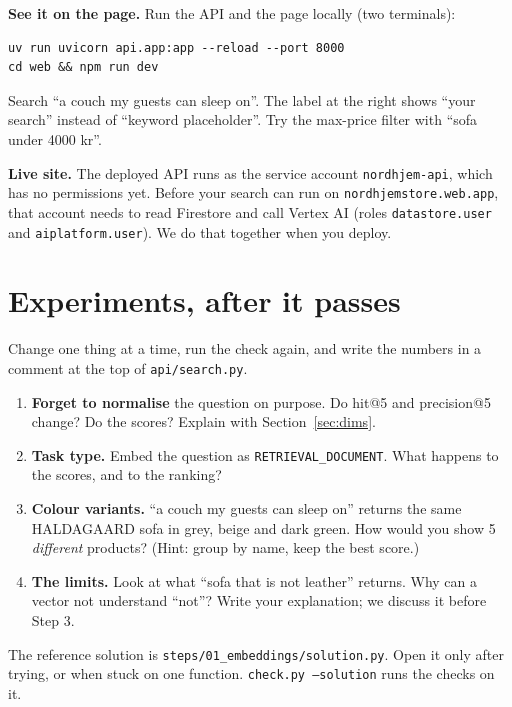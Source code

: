 \documentclass[11pt,a4paper]{article}
\newcommand{\code}[1]{\texttt{#1}}
\begin{document}
\textbf{See it on the page.} Run the API and the page locally (two
terminals):
\begin{lstlisting}[backgroundcolor=\color{white}]
uv run uvicorn api.app:app --reload --port 8000
cd web && npm run dev
\end{lstlisting}
Search ``a couch my guests can sleep on''. The label at the right shows
``your search'' instead of ``keyword placeholder''. Try the max-price
filter with ``sofa under 4000 kr''.

\begin{note}
\textbf{Live site.} The deployed API runs as the service account
\code{nordhjem-api}, which has no permissions yet. Before your search
can run on \code{nordhjemstore.web.app}, that account needs to read
Firestore and call Vertex AI (roles \code{datastore.user} and
\code{aiplatform.user}). We do that together when you deploy.
\end{note}

\section{Experiments, after it passes}

Change one thing at a time, run the check again, and write the numbers
in a comment at the top of \code{api/search.py}.

\begin{enumerate}[leftmargin=1.6em, itemsep=0.35em]
  \item \textbf{Forget to normalise} the question on purpose. Do hit@5
        and precision@5 change? Do the scores? Explain with
        Section~\ref{sec:dims}.
  \item \textbf{Task type.} Embed the question as
        \code{RETRIEVAL\_DOCUMENT}. What happens to the scores, and to
        the ranking?
  \item \textbf{Colour variants.} ``a couch my guests can sleep on''
        returns the same HALDAGAARD sofa in grey, beige and dark green.
        How would you show 5 \emph{different} products? (Hint: group by
        name, keep the best score.)
  \item \textbf{The limits.} Look at what ``sofa that is not leather''
        returns. Why can a vector not understand ``not''? Write your
        explanation; we discuss it before Step 3.
\end{enumerate}

\begin{note}
The reference solution is \code{steps/01\_embeddings/solution.py}. Open
it only after trying, or when stuck on one function.
\code{check.py --solution} runs the checks on it.
\end{note}
\end{document}
